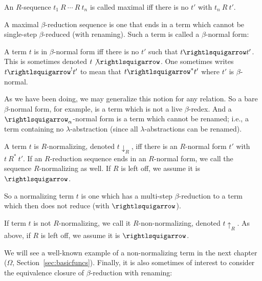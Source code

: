 \begin{definition}
  An $R$-sequence $t_1\ R \ \cdots\ R\ t_n$ is called maximal iff
  there is no $t'$ with $t_n\ R \ t'$.
  \end{definition}

A maximal $\beta$-reduction sequence is one that ends in a term
which cannot be single-step $\beta$-reduced (with renaming).  Such
a term is called a $\beta$-normal form:

\begin{definition}
\label{def:betanf}
  A term $t$ is in $\beta$-normal form iff there is no $t'$ such
  that $t\betaa t'$.  This is sometimes denoted $t \not\betaa$.
  One sometimes writes $t\betaa^! t'$ to mean
  that $t\betaa^*t'$ where $t'$ is $\beta$-normal.
\end{definition}

As we have been doing, we may generalize this notion for any relation.
So a bare $\beta$-normal form, for example, is a term which is not a
live $\beta$-redex.  And a $\curva_\alpha$-normal form is a term which
cannot be renamed; i.e., a term containing no $\lambda$-abstraction
(since all $\lambda$-abstractions can be renamed).

\begin{definition}[normalizing]
\label{def:normalizing}
  A term $t$ is $R$-normalizing, denoted $t \downarrow_R$, iff there is an $R$-normal form $t'$ with $t\ R^*\ t'$.
  If an $R$-reduction sequence ends in an $R$-normal form, we call the sequence $R$-normalizing as well.
  If $R$ is left off, we assume it is $\betaa$.
\end{definition}

So a normalizing term $t$ is one which has a multi-step $\beta$-reduction to a term
which then does not reduce (with $\betaa$).  

\begin{definition}
\label{def:nonnorm}
  If term $t$ is not $R$-normalizing, we call it $R$-non-normalizing, denoted $t \uparrow_R$.
  As above, if $R$ is left off, we assume it is $\betaa$.
\end{definition}

We will see a well-known example of a non-normalizing term in the next
chapter ($\Omega$, Section~\ref{sec:basicfuncs}).  Finally, it is also
sometimes of interest to consider the equivalence closure of
$\beta$-reduction with renaming:

